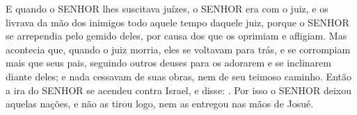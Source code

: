 {  E quando o SENHOR lhes suscitava juízes, o SENHOR era com o juiz, e os livrava da mão dos inimigos todo aquele tempo daquele juiz, porque o SENHOR se arrependia pelo gemido deles, por causa dos que os oprimiam e afligiam. %
  Mas acontecia que, quando o juiz morria, eles se voltavam para trás, e se corrompiam mais que seus pais, seguindo outros deuses para os adorarem e se inclinarem diante deles; e nada cessavam de suas obras, nem de seu teimoso caminho.
  Então a ira do SENHOR se acendeu contra Israel, e disse: .
  Por isso o SENHOR deixou aquelas nações, e não as tirou logo, nem as entregou nas mãos de Josué.
\par }

